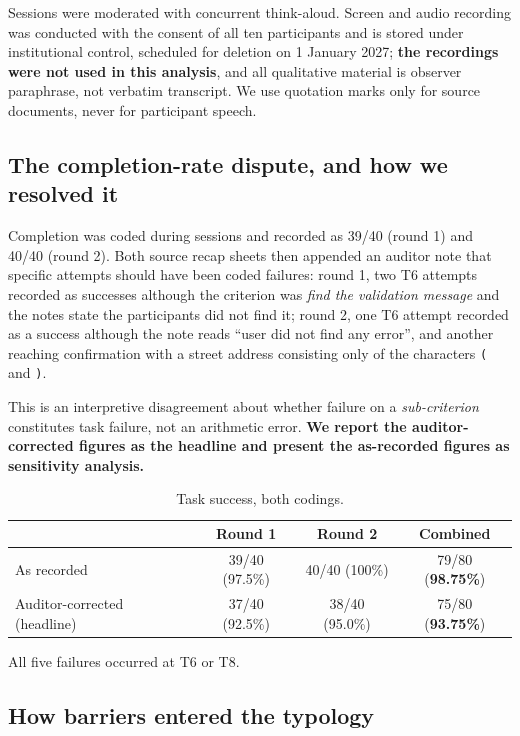 \documentclass[]{interact}
\theoremstyle{plain}
\begin{document}
Sessions were moderated with concurrent think-aloud. Screen and audio recording was conducted with the
consent of all ten participants and is stored under institutional control, scheduled for deletion on
1 January 2027; \textbf{the recordings were not used in this analysis}, and all qualitative material is
observer paraphrase, not verbatim transcript. We use quotation marks only for source documents, never
for participant speech.

\subsection{The completion-rate dispute, and how we resolved it}

Completion was coded during sessions and recorded as 39/40 (round 1) and 40/40 (round 2). Both source
recap sheets then appended an auditor note that specific attempts should have been coded failures:
round 1, two T6 attempts recorded as successes although the criterion was \emph{find the validation
message} and the notes state the participants did not find it; round 2, one T6 attempt recorded as a
success although the note reads ``user did not find any error'', and another reaching confirmation with
a street address consisting only of the characters \texttt{(} and \texttt{)}.

This is an interpretive disagreement about whether failure on a \emph{sub-criterion} constitutes task
failure, not an arithmetic error. \textbf{We report the auditor-corrected figures as the headline and
present the as-recorded figures as sensitivity analysis.}

\begin{table}[htbp]
\caption{Task success, both codings.}
\begin{tabular}{@{}lccc@{}}
\toprule
 & Round 1 & Round 2 & Combined \\
\midrule
As recorded & 39/40 (97.5\%) & 40/40 (100\%) & 79/80 (\textbf{98.75\%}) \\
Auditor-corrected (headline) & 37/40 (92.5\%) & 38/40 (95.0\%) & 75/80 (\textbf{93.75\%}) \\
\bottomrule
\end{tabular}
\end{table}

All five failures occurred at T6 or T8.

\subsection{How barriers entered the typology}
\end{document}
